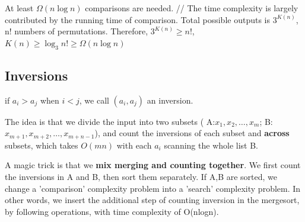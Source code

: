 \begin{remark}
    At least $\Omega(n\log n)$ comparisons are needed. //
    The time complexity is largely contributed by the running time of comparison.
    Total possible outputs is $3^{K(n)}$, n! numbers of permutations. Therefore, $3^{K(n)}\geq n!$, $K(n)\geq \log_3n! \geq \Omega(n\log n)$

\end{remark}

\subsection{Inversions}
\begin{defi}
    if $a_i>a_j$ when $i<j$, we call $(a_i,a_j)$ an inversion.
\end{defi}

The idea is that we divide the input into two subsets ( A:$x_1, x_2, \ldots , x_{m}$; B:$x_{m+1}, x_{m+2},\ldots, x_{m+n-1}$), and count the inversions of each subset and \textbf{across} subsets, which takes $O(mn)$ with each $a_i$ scanning the whole list B.

A magic trick is that we \textbf{mix merging and counting together}. We first count the inversions in A and B, then sort them separately.
If A,B are sorted, we change a 'comparison' complexity problem into a 'search' complexity problem.
In other words, we  insert the additional step of counting inversion in the mergesort, by following operations, with time complexity of O(nlogn).


